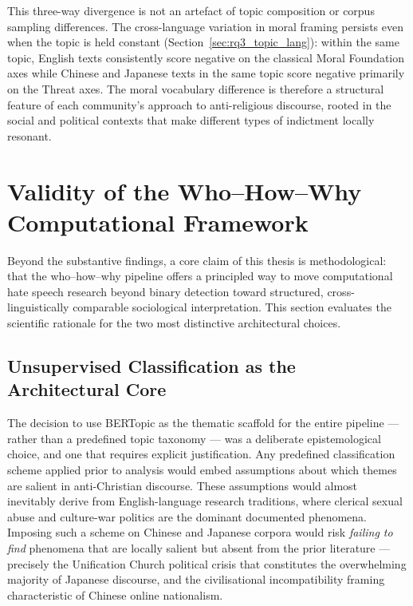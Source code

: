 \documentclass[../CLthesis.tex]{subfiles}
\begin{document}
This three-way divergence is not an artefact of topic composition or corpus sampling differences. The cross-language variation in moral framing persists even when the topic is held constant (Section~\ref{sec:rq3_topic_lang}): within the same topic, English texts consistently score negative on the classical Moral Foundation axes while Chinese and Japanese texts in the same topic score negative primarily on the Threat axes. The moral vocabulary difference is therefore a structural feature of each community's approach to anti-religious discourse, rooted in the social and political contexts that make different types of indictment locally resonant.

\section{Validity of the Who--How--Why Computational Framework}
\label{sec:discussion-pipeline}

Beyond the substantive findings, a core claim of this thesis is methodological: that the who--how--why pipeline offers a principled way to move computational hate speech research beyond binary detection toward structured, cross-linguistically comparable sociological interpretation. This section evaluates the scientific rationale for the two most distinctive architectural choices.

\subsection{Unsupervised Classification as the Architectural Core}

The decision to use BERTopic as the thematic scaffold for the entire pipeline --- rather than a predefined topic taxonomy --- was a deliberate epistemological choice, and one that requires explicit justification. Any predefined classification scheme applied prior to analysis would embed assumptions about which themes are salient in anti-Christian discourse. These assumptions would almost inevitably derive from English-language research traditions, where clerical sexual abuse and culture-war politics are the dominant documented phenomena. Imposing such a scheme on Chinese and Japanese corpora would risk \emph{failing to find} phenomena that are locally salient but absent from the prior literature --- precisely the Unification Church political crisis that constitutes the overwhelming majority of Japanese discourse, and the civilisational incompatibility framing characteristic of Chinese online nationalism.
\end{document}

